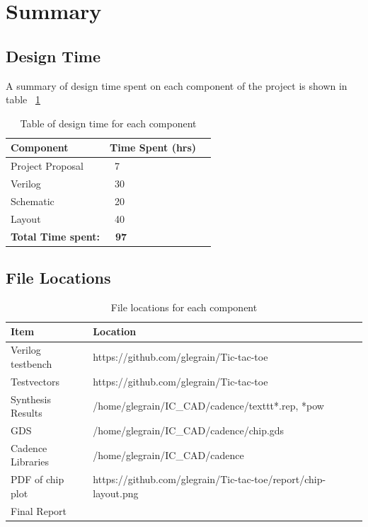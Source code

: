 \documentclass[]{article}
\begin{document}
\section{Summary}
\label{sec:summary}


\subsection{Design Time}
\label{sec:designtime}
A summary of design time spent on each component of the project is shown in table ~\ref{tab:designtime}

\begin{table}
\centering
\caption{Table of design time for each component}
\begin{tabular}{ | l | l | l |}
\hline
    Component              & Time Spent (hrs) \\
\hline
    Project Proposal        & ~7 \\
\hline
    Verilog                 & ~30\\
\hline
    Schematic               & ~20\\
\hline
    Layout                  & ~40\\
\hline
    \textbf{Total Time spent:}& \textbf{~97} \\
\hline
\end{tabular}

\label{tab:designtime}
\end{table}
\subsection{File Locations}
\label{sec:filelocations}
\begin{table}
\centering
\caption{File locations for each component}
\begin{tabular}{ |p{3cm} | l |}
\hline
    Item                & Location \\
\hline
    Verilog testbench   & https://github.com/glegrain/Tic-tac-toe\\
\hline
    Testvectors         & https://github.com/glegrain/Tic-tac-toe\\
\hline
    Synthesis Results   & /home/glegrain/IC\_CAD/cadence/texttt{*.rep, *pow}\\
\hline
    GDS                 & /home/glegrain/IC\_CAD/cadence/chip.gds\\
\hline
    Cadence Libraries   & /home/glegrain/IC\_CAD/cadence\\
\hline
    PDF of chip plot    &  https://github.com/glegrain/Tic-tac-toe/report/chip-layout.png\\ 
\hline
    Final Report        & \\
\hline  
\end{tabular}

\label{tab:filelocations}
\end{table}
\end{document}
